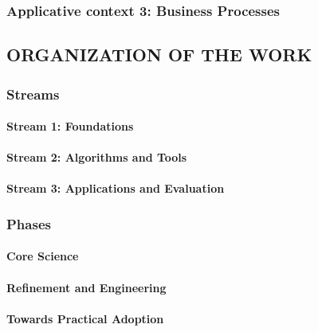 \subsubsection{Applicative context 3: Business Processes}

\subsection{ORGANIZATION OF THE WORK}

\subsubsection{Streams}
\paragraph{Stream 1: Foundations}
\paragraph{Stream 2: Algorithms and Tools}
\paragraph{Stream 3: Applications and Evaluation}

\subsubsection{Phases}
\paragraph{Core Science}
\paragraph{Refinement and Engineering}
\paragraph{Towards Practical Adoption}


